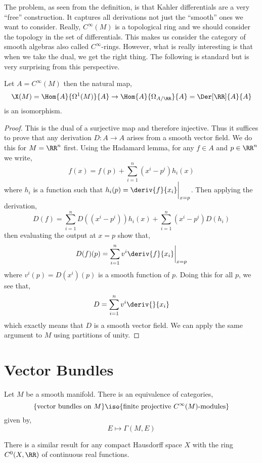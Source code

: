\documentclass[12pt]{article}
\begin{document}
The problem, as seen from the definition, is that Kahler differentials are a very ``free'' construction. It captures all derivations not just the ``smooth'' ones we want to consider. Really, $C^{\infty}(M)$ is a topological ring and we should consider the topology in the set of differentials. This makes us consider the category of smooth algebras also called $C^{\infty}$-rings. However, what is really interesting is that when we take the dual, we get the right thing. The following is standard but is very surprising from this perspective.

\begin{prop}
Let $A = C^{\infty}(M)$ then the natural map,
\[ \X(M) = \Hom{A}{\Omega^1(M)}{A} \to \Hom{A}{\Omega_{A/\RR}}{A} = \Der[\RR]{A}{A} \]
is an isomorphism.
\end{prop} 

\begin{proof}
This is the dual of a surjective map and therefore injective. Thus it suffices to prove that any derivation $D : A \to A$ arises from a smooth vector field. We do this for $M = \RR^n$ first. Using the Hadamard lemma, for any $f \in A$ and $p \in \RR^n$ we write,
\[ f(x) = f(p) + \sum_{i = 1}^n (x^i - p^i) h_i(x) \]
where $h_i$ is a function such that $h_i(p) = \deriv{f}{x_i} \bigg|_{x = p}$. Then applying the derivation,
\[ D(f) = \sum_{i = 1}^n D((x^i - p^i)) h_i(x) + \sum_{i = 1}^n (x^i - p^i) D(h_i) \]
then evaluating the output at $x = p$ show that,
\[ D(f)(p) = \sum_{i = 1}^n v^i \deriv{f}{x_i} \bigg|_{x = p} \]
where $v^i(p) = D(x^i)(p)$ is a smooth function of $p$. Doing this for all $p$, we see that,
\[ D = \sum_{i = 1}^n v^i \deriv{}{x_i} \]
which exactly means that $D$ is a smooth vector field. We can apply the same argument to $M$ using partitions of unity.
\end{proof}


\section{Vector Bundles}

\begin{theorem}
Let $M$ be a smooth manifold. There is an equivalence of categories,
\[ \{ \text{vector bundles on } M \} \iso \{ \text{finite projective } C^{\infty}(M)\text{-modules} \} \]
given by,
\[ E \mapsto \Gamma(M, E) \]
\end{theorem}

\begin{rmk}
There is a similar result for any compact Hausdorff space $X$ with the ring $C^0(X, \RR)$ of continuous real functions.
\end{rmk}
\end{document}
